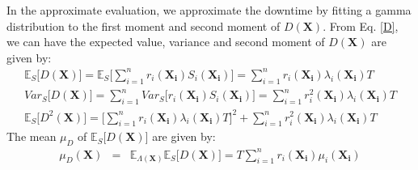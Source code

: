 \documentclass[preprint,12pt]{elsarticle}
\begin{document}
In the approximate evaluation, we approximate the downtime by fitting a gamma distribution to the first moment and second moment of $D(\boldsymbol{X})$. From Eq. \eqref{D}, we can have the expected value, variance and second moment of $D(\boldsymbol{X})$ are given by:
\begin{eqnarray}
\mathbb{E}_{S}\bigg[D(\boldsymbol{X})\bigg]=\mathbb{E}_{S}\bigg[\sum_{i=1}^{n}{r_{i}(\boldsymbol{X_{i}})S_{i}(\boldsymbol{X_{i}})}\bigg]=\sum_{i=1}^{n}{r_{i}(\boldsymbol{X_{i}})\lambda_{i}(\boldsymbol{X_{i}})T}
\label{ED1}\\
Var_{S}\bigg[D(\boldsymbol{X})\bigg]=\sum_{i=1}^{n}{Var_{S}\bigg[{r_{i}(\boldsymbol{X_{i}})S_{i}(\boldsymbol{X_{i}})}\bigg]}=\sum_{i=1}^{n}{r_{i}^{2}(\boldsymbol{X_{i}})\lambda_{i}(\boldsymbol{X_{i}})T}
\label{VD1}\\
\mathbb{E}_{S}\bigg[D^{2}(\boldsymbol{X}) \bigg]= \bigg[\sum_{i=1}^{n}{r_{i}(\boldsymbol{X_{i}})\lambda_{i}(\boldsymbol{X_{i}})T}\bigg]^{2} + \sum_{i=1}^{n}{r_{i}^{2}(\boldsymbol{X_{i}})\lambda_{i}(\boldsymbol{X_{i}})T}
\end{eqnarray}
The mean $\mu_{D}$ of $\mathbb{E}_{S}\bigg[D(\boldsymbol{X})\bigg]$ are given by:
\begin{eqnarray}
\mu_{D}(\boldsymbol{X})&=&\mathbb{E}_{\Lambda(\boldsymbol{X})}\mathbb{E}_{S} \bigg[D(\boldsymbol{X}) \bigg]=T\sum_{i=1}^{n}{r_{i}(\boldsymbol{X_i})\mu_{i}(\boldsymbol{X_i})}
\label{muD}
\end{eqnarray}
\end{document}
